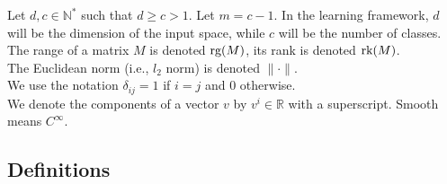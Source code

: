\documentclass[entropy,article,submit,pdftex,moreauthors]{Definitions/mdpi}
\newcommand{\R}{\ensuremath{\mathbb{R}}}
\newcommand{\N}{\ensuremath{\mathbb{N}}}
\newcommand{\GL}{\ensuremath{\text{GL}}}
\theoremstyle{plain}
\theoremstyle{definition}
\newcommand{\M}{\mathcal{M}}
\newcommand{\Oc}{\mathcal{O}}
\newcommand{\Sc}{\mathcal{S}}
\newcommand{\rg}{\textnormal{rg}}
\newcommand{\rk}{\textnormal{rk}}
\newcommand{\Sp}{\textnormal{sp}}
\begin{document}
Let $d, c \in \N^*$ such that $d \geq c > 1$. Let $m = c-1$. In the learning framework, $d$ will be the dimension of the input space, while $c$ will be the number of classes. \\
The range of a matrix $M$ is denoted $\rg(M)$, its rank is denoted $\rk(M)$. \\
The Euclidean norm (i.e., $l_2$ norm) is denoted $\| \cdot \|$. \\
We use the notation $\delta_{ij} = 1$ if $i=j$ and 0 otherwise. \\
We denote the components of a vector $v$ by $v^i \in \R$ with a superscript. Smooth means $C^{\infty}$.

\subsection{Definitions}
\end{document}
